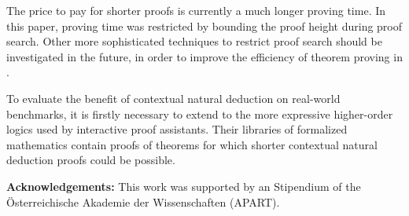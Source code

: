 \documentclass{llncs}
\begin{document}
The price to pay for shorter proofs is currently a much longer proving time. In this paper, proving time was restricted by bounding the proof height during proof search. Other more sophisticated techniques to restrict proof search should be investigated in the future, in order to improve the efficiency of theorem proving in {\NDd}.

To evaluate the benefit of contextual natural deduction on real-world benchmarks, it is firstly necessary to extend {\NDd} to the more expressive higher-order logics used by interactive proof assistants. Their libraries of formalized mathematics contain proofs of theorems for which shorter contextual natural deduction proofs could be possible. 

\medskip

\noindent
\textbf{Acknowledgements: } This work was supported by an Stipendium of the \"Osterreichische Akademie der Wissenschaften (APART).




\end{document}
